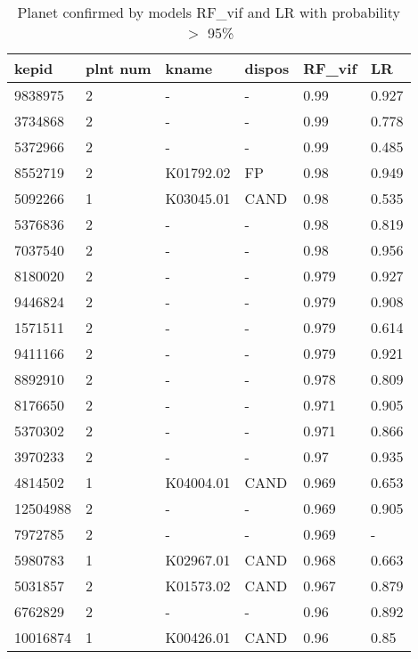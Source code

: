 \begin{table}[!htbp]
 \centering
 \caption{Planet confirmed by models RF\_vif and LR with probability $>$ 95\%}
 \label{dataRFvifLRcreftab} 
  \begin{tabular}
{| 
 p{}| 
 p{}| 
 p{}| 
 p{}| 
 p{}| 
 p{}| 
}\hline 
\textbf{kepid} &\textbf{plnt num} &\textbf{kname} &\textbf{dispos} &\textbf{RF\_vif} &\textbf{LR} \\ \hline 
9838975 &2 &- &- &0.99 &0.927 \\ \hline 
3734868 &2 &- &- &0.99 &0.778 \\ \hline 
5372966 &2 &- &- &0.99 &0.485 \\ \hline 
8552719 &2 &K01792.02 &FP &0.98 &0.949 \\ \hline 
5092266 &1 &K03045.01 &CAND &0.98 &0.535 \\ \hline 
5376836 &2 &- &- &0.98 &0.819 \\ \hline 
7037540 &2 &- &- &0.98 &0.956 \\ \hline 
8180020 &2 &- &- &0.979 &0.927 \\ \hline 
9446824 &2 &- &- &0.979 &0.908 \\ \hline 
1571511 &2 &- &- &0.979 &0.614 \\ \hline 
9411166 &2 &- &- &0.979 &0.921 \\ \hline 
8892910 &2 &- &- &0.978 &0.809 \\ \hline 
8176650 &2 &- &- &0.971 &0.905 \\ \hline 
5370302 &2 &- &- &0.971 &0.866 \\ \hline 
3970233 &2 &- &- &0.97 &0.935 \\ \hline 
4814502 &1 &K04004.01 &CAND &0.969 &0.653 \\ \hline 
12504988 &2 &- &- &0.969 &0.905 \\ \hline 
7972785 &2 &- &- &0.969 &- \\ \hline 
5980783 &1 &K02967.01 &CAND &0.968 &0.663 \\ \hline 
5031857 &2 &K01573.02 &CAND &0.967 &0.879 \\ \hline 
6762829 &2 &- &- &0.96 &0.892 \\ \hline 
10016874 &1 &K00426.01 &CAND &0.96 &0.85 \\ \hline 

\end{tabular}
\end{table}
